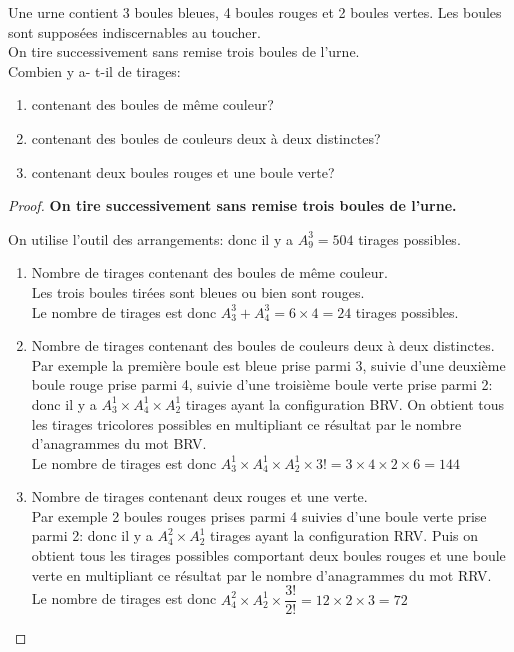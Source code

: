\begin{exercice}
 Une urne contient 3 boules bleues, 4 boules rouges et 2 boules vertes. Les boules sont supposées indiscernables au toucher.\\
 On tire successivement sans remise trois boules de l'urne.\\
Combien y a- t-il de tirages:
\begin{enumerate}
\item contenant des boules de même couleur?
\item contenant des boules de couleurs  deux à deux distinctes?
\item  contenant deux boules rouges et une boule verte?
\end{enumerate}
\end{exercice}
\begin{proof}
 \textbf{On tire successivement sans remise trois boules de l'urne.} 
 
On utilise l'outil des arrangements: donc il y a $ A_{9}^{3}=504 $ tirages possibles.
\begin{enumerate}
\item Nombre de tirages contenant des boules de même couleur.\\
 Les trois boules tirées sont bleues ou bien  sont rouges.\\
Le nombre de tirages est donc  $ A_{3}^{3}+ A_{4}^{3} = 6\times 4 =24$ tirages possibles.
\item Nombre de tirages contenant des boules de couleurs deux à deux distinctes.\\
Par exemple la première boule est bleue prise parmi 3, suivie d'une deuxième boule   rouge prise parmi 4, suivie d'une troisième boule verte prise parmi 2: donc il y a $ A_{3}^{1}\times A_{4}^{1}\times A_{2}^{1} $ tirages ayant la  configuration BRV. On obtient tous les tirages  tricolores possibles en multipliant ce résultat par le nombre d'anagrammes du mot BRV. \\
Le nombre de tirages est donc  $ A_{3}^{1}\times A_{4}^{1}\times A_{2}^{1}\times 3!=3\times 4\times 2\times6=144 $ 
\item  Nombre de tirages contenant deux rouges et une verte.\\
Par exemple 2 boules rouges prises parmi 4 suivies  d'une boule verte prise parmi 2: donc il y a $ A_{4}^{2}\times A_{2}^{1} $ tirages ayant la configuration RRV. Puis on obtient tous les tirages possibles comportant deux  boules rouges et une boule verte  en multipliant ce résultat  par le nombre d'anagrammes du mot RRV.\\
Le nombre de tirages est donc $ A_{4}^{2}\times A_{2}^{1}\times \dfrac{3!}{2!}=12\times2\times3=72 $
\end{enumerate}
  \end{proof}

